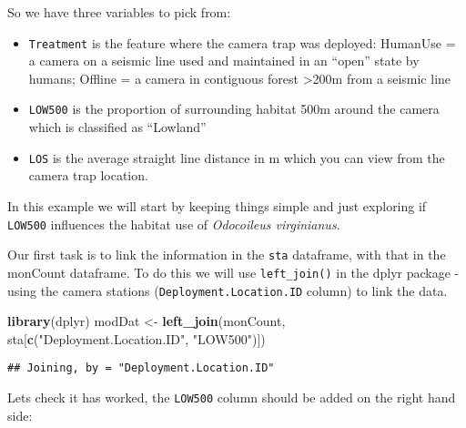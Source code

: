\documentclass[]{book}
\newenvironment{Shaded}{\begin{snugshade}}{\end{snugshade}}
\newcommand{\KeywordTok}[1]{\textcolor[rgb]{0.13,0.29,0.53}{\textbf{#1}}}
\newcommand{\DataTypeTok}[1]{\textcolor[rgb]{0.13,0.29,0.53}{#1}}
\newcommand{\StringTok}[1]{\textcolor[rgb]{0.31,0.60,0.02}{#1}}
\newcommand{\OperatorTok}[1]{\textcolor[rgb]{0.81,0.36,0.00}{\textbf{#1}}}
\newcommand{\NormalTok}[1]{#1}
\providecommand{\tightlist}{%
  \setlength{\itemsep}{0pt}\setlength{\parskip}{0pt}}
\begin{document}
So we have three variables to pick from:

\begin{itemize}
\tightlist
\item
  \texttt{Treatment} is the feature where the camera trap was deployed:
  HumanUse = a camera on a seismic line used and maintained in an
  ``open'' state by humans; Offline = a camera in contiguous forest
  \textgreater{}200m from a seismic line\\
\item
  \texttt{LOW500} is the proportion of surrounding habitat 500m around
  the camera which is classified as ``Lowland''
\item
  \texttt{LOS} is the average straight line distance in m which you can
  view from the camera trap location.
\end{itemize}

In this example we will start by keeping things simple and just
exploring if \texttt{LOW500} influences the habitat use of
\emph{Odocoileus virginianus}.

Our first task is to link the information in the \texttt{sta} dataframe,
with that in the monCount dataframe. To do this we will use
\texttt{left\_join()} in the dplyr package - using the camera stations
(\texttt{Deployment.Location.ID} column) to link the data.

\begin{Shaded}
\begin{Highlighting}[]
\KeywordTok{library}\NormalTok{(dplyr)}
\NormalTok{modDat <-}\StringTok{ }\KeywordTok{left_join}\NormalTok{(monCount, sta[}\KeywordTok{c}\NormalTok{(}\StringTok{"Deployment.Location.ID"}\NormalTok{, }\StringTok{"LOW500"}\NormalTok{)])}
\end{Highlighting}
\end{Shaded}

\begin{verbatim}
## Joining, by = "Deployment.Location.ID"
\end{verbatim}

Lets check it has worked, the \texttt{LOW500} column should be added on
the right hand side:

\begin{Shaded}
\end{Shaded}
\end{document}
